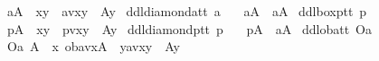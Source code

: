\begin{isabellebody}
\ \ \ {\isachardoublequoteopen}{\isasymbox}\isactrlsub aA\ {\isasymequiv}\ {\isasymlambda}x{\isachardot}{\isasymforall}y{\isachardot}\ {\isacharparenleft}{\isasymnot}\ av{\isacharparenleft}x{\isacharparenright}{\isacharparenleft}y{\isacharparenright}\ {\isasymor}\ A{\isacharparenleft}y{\isacharparenright}{\isacharparenright}{\isachardoublequoteclose}\isanewline
{}\isamarkupfalse%
\ ddldiamonda{\isacharcolon}{\isacharcolon}{\isachardoublequoteopen}t{\isasymRightarrow}t{\isachardoublequoteclose}\ {\isacharparenleft}{\isachardoublequoteopen}{\isasymdiamond}\isactrlsub a{\isachardoublequoteclose}{\isacharparenright}\isanewline
\ \ \ {\isachardoublequoteopen}{\isasymdiamond}\isactrlsub aA\ {\isasymequiv}\ \isactrlbold {\isasymnot}{\isacharparenleft}{\isasymbox}\isactrlsub a{\isacharparenleft}\isactrlbold {\isasymnot}A{\isacharparenright}{\isacharparenright}{\isachardoublequoteclose}\isanewline
{}\isamarkupfalse%
\ ddlboxp{\isacharcolon}{\isacharcolon}{\isachardoublequoteopen}t{\isasymRightarrow}t{\isachardoublequoteclose}\ {\isacharparenleft}{\isachardoublequoteopen}{\isasymbox}\isactrlsub p{\isachardoublequoteclose}{\isacharparenright}\isanewline
\ \ \ {\isachardoublequoteopen}{\isasymbox}\isactrlsub pA\ {\isasymequiv}\ {\isasymlambda}x{\isachardot}{\isasymforall}y{\isachardot}\ {\isacharparenleft}{\isasymnot}\ pv{\isacharparenleft}x{\isacharparenright}{\isacharparenleft}y{\isacharparenright}\ {\isasymor}\ A{\isacharparenleft}y{\isacharparenright}{\isacharparenright}{\isachardoublequoteclose}\isanewline
{}\isamarkupfalse%
\ ddldiamondp{\isacharcolon}{\isacharcolon}{\isachardoublequoteopen}t{\isasymRightarrow}t{\isachardoublequoteclose}\ {\isacharparenleft}{\isachardoublequoteopen}{\isasymdiamond}\isactrlsub p{\isachardoublequoteclose}{\isacharparenright}\isanewline
\ \ \ {\isachardoublequoteopen}{\isasymdiamond}\isactrlsub pA\ {\isasymequiv}\ \isactrlbold {\isasymnot}{\isacharparenleft}{\isasymbox}\isactrlsub a{\isacharparenleft}\isactrlbold {\isasymnot}A{\isacharparenright}{\isacharparenright}{\isachardoublequoteclose}\isanewline
\isanewline
%
\isanewline
{}\isamarkupfalse%
\ ddloba{\isacharcolon}{\isacharcolon}{\isachardoublequoteopen}t{\isasymRightarrow}t{\isachardoublequoteclose}\ {\isacharparenleft}{\isachardoublequoteopen}O\isactrlsub a{\isachardoublequoteclose}{\isacharparenright}\isanewline
\ \ \ {\isachardoublequoteopen}O\isactrlsub a\ A\ {\isasymequiv}\ {\isasymlambda}x{\isachardot}\ ob{\isacharparenleft}av{\isacharparenleft}x{\isacharparenright}{\isacharparenright}{\isacharparenleft}A{\isacharparenright}\ {\isasymand}\ {\isacharparenleft}{\isasymexists}y{\isachardot}{\isacharparenleft}av{\isacharparenleft}x{\isacharparenright}{\isacharparenleft}y{\isacharparenright}\ {\isasymand}\ {\isasymnot}A{\isacharparenleft}y{\isacharparenright}{\isacharparenright}{\isacharparenright}{\isachardoublequoteclose}\isanewline

\end{isabellebody}
